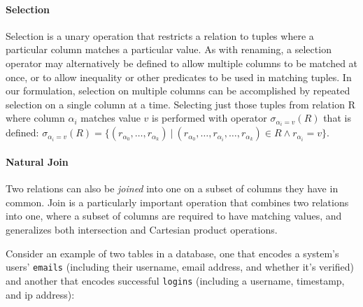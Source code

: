 \paragraph{Selection} Selection is a unary operation that restricts a relation to tuples where a particular column matches a particular value. As with renaming, a selection operator may alternatively be defined to allow multiple columns to be matched at once, or to allow inequality or other predicates to be used in matching tuples. In our formulation, selection on multiple columns can be accomplished by repeated selection on a single column at a time. Selecting just those tuples from relation R where column $\alpha_i$ matches value $v$ is performed with operator $\sigma_{\alpha_i = v}(R)$ that is defined: \newline$\sigma_{\alpha_i = v}(R) = \{ (r_{\alpha_0}, \ldots, r_{\alpha_k}) \ |\ (r_{\alpha_0}, \ldots, r_{\alpha_i}, \ldots, r_{\alpha_k}) \in R \wedge r_{\alpha_i} = v \}$.

\paragraph{Natural Join} Two relations can also be \textit{joined} into one on a subset of columns they have in common. Join is a particularly important operation that combines two relations into one, where a subset of columns are required to have matching values, and generalizes both intersection and Cartesian product operations.

Consider an example of two tables in a database, one that encodes a system's users' \texttt{emails} (including their username, email address, and whether it's verified) and another that encodes successful \texttt{logins} (including a username, timestamp, and ip address):

